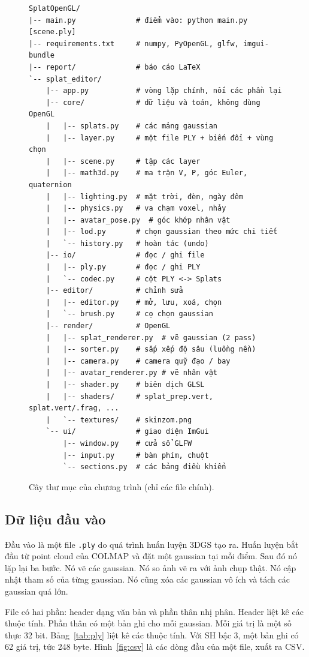 \documentclass[9pt,twocolumn,a4paper]{extarticle}
\newcommand{\code}[1]{\texttt{#1}}
\begin{document}
\begin{figure}[H]
\centering
\begin{Verbatim}[fontsize=\fontsize{5.6}{6.6}\selectfont,frame=single]
SplatOpenGL/
|-- main.py              # điểm vào: python main.py [scene.ply]
|-- requirements.txt     # numpy, PyOpenGL, glfw, imgui-bundle
|-- report/              # báo cáo LaTeX
`-- splat_editor/
    |-- app.py           # vòng lặp chính, nối các phần lại
    |-- core/            # dữ liệu và toán, không dùng OpenGL
    |   |-- splats.py    # các mảng gaussian
    |   |-- layer.py     # một file PLY + biến đổi + vùng chọn
    |   |-- scene.py     # tập các layer
    |   |-- math3d.py    # ma trận V, P, góc Euler, quaternion
    |   |-- lighting.py  # mặt trời, đèn, ngày đêm
    |   |-- physics.py   # va chạm voxel, nhảy
    |   |-- avatar_pose.py  # góc khớp nhân vật
    |   |-- lod.py       # chọn gaussian theo mức chi tiết
    |   `-- history.py   # hoàn tác (undo)
    |-- io/              # đọc / ghi file
    |   |-- ply.py       # đọc / ghi PLY
    |   `-- codec.py     # cột PLY <-> Splats
    |-- editor/          # chỉnh sửa
    |   |-- editor.py    # mở, lưu, xoá, chọn
    |   `-- brush.py     # cọ chọn gaussian
    |-- render/          # OpenGL
    |   |-- splat_renderer.py  # vẽ gaussian (2 pass)
    |   |-- sorter.py    # sắp xếp độ sâu (luồng nền)
    |   |-- camera.py    # camera quỹ đạo / bay
    |   |-- avatar_renderer.py # vẽ nhân vật
    |   |-- shader.py    # biên dịch GLSL
    |   |-- shaders/     # splat_prep.vert, splat.vert/.frag, ...
    |   `-- textures/    # skinzom.png
    `-- ui/              # giao diện ImGui
        |-- window.py    # cửa sổ GLFW
        |-- input.py     # bàn phím, chuột
        `-- sections.py  # các bảng điều khiển
\end{Verbatim}
\caption{Cây thư mục của chương trình (chỉ các file chính).}
\label{fig:tree}
\end{figure}

\subsection{Dữ liệu đầu vào}
\label{sec:input}
Đầu vào là một file \code{.ply} do quá trình huấn luyện 3DGS tạo ra. Huấn luyện bắt đầu từ point cloud của COLMAP và đặt một gaussian tại mỗi điểm. Sau đó nó lặp lại ba bước. Nó vẽ các gaussian. Nó so ảnh vẽ ra với ảnh chụp thật. Nó cập nhật tham số của từng gaussian. Nó cũng xóa các gaussian vô ích và tách các gaussian quá lớn.

File có hai phần: header dạng văn bản và phần thân nhị phân. Header liệt kê các thuộc tính. Phần thân có một bản ghi cho mỗi gaussian. Mỗi giá trị là một số thực 32 bit. Bảng~\ref{tab:ply} liệt kê các thuộc tính. Với SH bậc 3, một bản ghi có 62 giá trị, tức 248 byte. Hình~\ref{fig:csv} là các dòng đầu của một file, xuất ra CSV.
\end{document}
